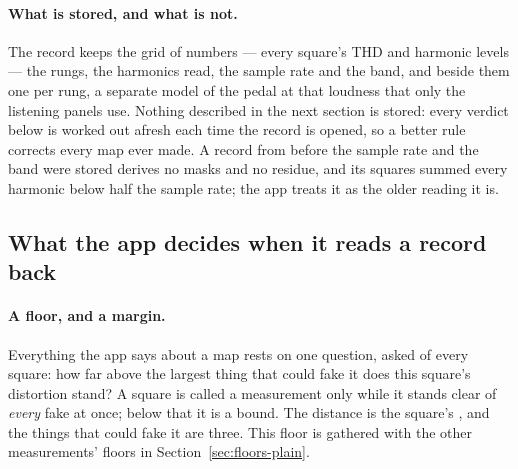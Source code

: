 \documentclass[11pt,a4paper]{article}
\begin{document}
\paragraph{What is stored, and what is not.} The record keeps the grid
of numbers --- every square's THD and harmonic levels --- the rungs, the
harmonics read, the sample rate and the band, and beside them one
 per rung, a separate model of the pedal at that
loudness that only the listening panels use. Nothing described in the
next section is stored: every verdict below is worked out afresh each
time the record is opened, so a better rule corrects every map ever
made. A record from before the sample rate and the band were stored
derives no masks and no residue, and its squares summed every harmonic
below half the sample rate; the app treats it as the older reading it is.

\subsection{What the app decides when it reads a record back}

\paragraph{A floor, and a margin.} Everything the app says about a map
rests on one question, asked of every square: how far above the largest
thing that could fake it does this square's distortion stand? A square is
called a measurement only while it stands clear of \emph{every} fake at
once; below that it is a bound. The distance is the square's
, and the things that could fake it are three. This
floor is gathered with the other measurements' floors in
Section~\ref{sec:floors-plain}.
\end{document}
